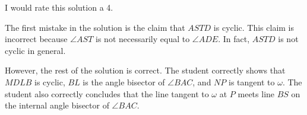 I would rate this solution a 4.

The first mistake in the solution is the claim that $ASTD$ is cyclic. This claim is incorrect because $\angle AST$ is not necessarily equal to $\angle ADE$. In fact, $ASTD$ is not cyclic in general.

However, the rest of the solution is correct. The student correctly shows that $MDLB$ is cyclic, $BL$ is the angle bisector of $\angle BAC$, and $NP$ is tangent to $\omega$. The student also correctly concludes that the line tangent to $\omega$ at $P$ meets line $BS$ on the internal angle bisector of $\angle BAC$.
